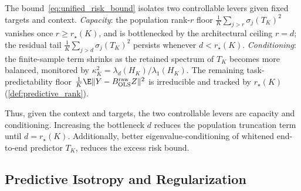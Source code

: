 \begin{remark}
\label{rem:two_stage_mechanism}
The bound~\eqref{eq:unified_risk_bound} isolates two controllable levers given fixed targets and context.
\emph{Capacity}: the population rank-$r$ floor $\frac{1}{K}\sum_{j>r}\sigma_j(T_K)^2$ vanishes once $r\ge r_\star(K)$, and is bottlenecked by the architectural ceiling $r=d$; the residual tail $\frac{1}{K}\sum_{j>d}\sigma_j(T_K)^2$ persists whenever $d<r_\star(K)$.
\emph{Conditioning}: the finite-sample term shrinks as the retained spectrum of $T_K$ becomes more balanced, monitored by $\kappa_K^2=\lambda_d(H_K)/\lambda_1(H_K)$.
The remaining task-predictability floor $\tfrac{1}{K}\E\|Y-B^{\mathrm{raw}}_{\mathrm{OLS}}Z\|^2$ is irreducible and tracked by $r_\star(K)$ (\cref{def:predictive_rank}).
\end{remark}

Thus, given the context and targets, the two controllable levers are capacity and conditioning.
Increasing the bottleneck $d$ reduces the population truncation term until $d= r_\star(K)$. 
Additionally, better eigenvalue-conditioning of whitened end-to-end predictor $T_K$, reduces the excess risk bound.





\subsection{Predictive Isotropy and Regularization}
\label{sec:predictive_isotropy}



